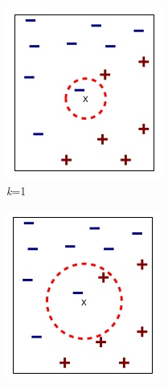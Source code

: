 \documentclass[12pt,oneside]{memoir}
\begin{document}
\begin{figure}[!ht]
    \centering
    \begin{subfigure}[b]{0.3\textwidth}
        \centering
        \includegraphics[width=\textwidth]{knna}
        \caption{\textit{k}=1}
        \label{fig:knna}
    \end{subfigure}
    \hfill
    \begin{subfigure}[b]{0.3\textwidth}
        \centering
        \includegraphics[width=\textwidth]{knnb}

\end{subfigure}
\end{figure}
\end{document}
